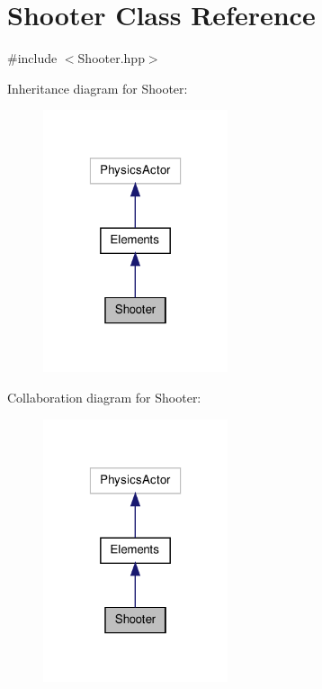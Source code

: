 \hypertarget{class_shooter}{\section{Shooter Class Reference}
\label{class_shooter}
}


{\ttfamily \#include $<$Shooter.\-hpp$>$}



Inheritance diagram for Shooter\-:
\nopagebreak
\begin{figure}[H]
\begin{center}
\leavevmode
\includegraphics[width=154pt]{class_shooter__inherit__graph}
\end{center}
\end{figure}


Collaboration diagram for Shooter\-:
\nopagebreak
\begin{figure}[H]
\begin{center}
\leavevmode
\includegraphics[width=154pt]{class_shooter__coll__graph}
\end{center}
\end{figure}
